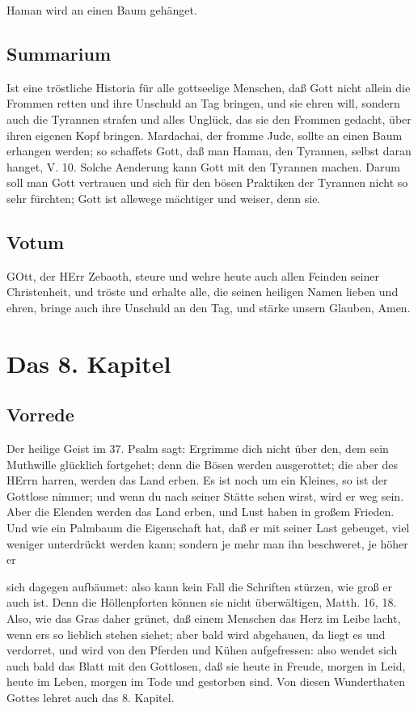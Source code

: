 Haman wird an einen Baum gehänget.

\section{Summarium}

Ist eine tröstliche Historia für alle gottseelige Menschen, daß Gott nicht allein die Frommen retten und ihre Unschuld an Tag bringen, und sie ehren will, sondern auch die Tyrannen strafen und alles Unglück, das sie den Frommen gedacht, über ihren eigenen Kopf bringen. Mardachai, der fromme Jude, sollte an einen Baum erhangen werden; so schaffets Gott, daß man Haman, den Tyrannen, selbst daran hanget, V. 10. Solche Aenderung kann Gott mit den Tyrannen machen. Darum soll man Gott vertrauen und sich für den bösen Praktiken der Tyrannen nicht so sehr fürchten; Gott ist allewege mächtiger und weiser, denn sie.

\section{Votum}

GOtt, der HErr Zebaoth, steure und wehre heute auch allen Feinden seiner Christenheit, und tröste und erhalte alle, die seinen heiligen Namen lieben und ehren, bringe auch ihre Unschuld an den Tag, und stärke unsern Glauben, Amen.

\chapter{Das 8. Kapitel}

\section{Vorrede}

Der heilige Geist im 37. Psalm sagt: Ergrimme dich nicht über den, dem sein Muthwille glücklich fortgehet; denn die Bösen werden ausgerottet; die aber des HErrn harren, werden das Land erben. Es ist noch um ein Kleines, so ist der Gottlose nimmer; und wenn du nach seiner Stätte sehen wirst, wird er weg sein. Aber die Elenden werden das Land erben, und Lust haben in großem Frieden. Und wie ein Palmbaum die Eigenschaft hat, daß er mit seiner Last gebeuget, viel weniger unterdrückt werden kann; sondern je mehr man ihn beschweret, je höher er

sich dagegen aufbäumet: also kann kein Fall die Schriften stürzen, wie groß er auch ist. Denn die Höllenpforten können sie nicht überwältigen, Matth. 16, 18. Also, wie das Gras daher grünet, daß einem Menschen das Herz im Leibe lacht, wenn ers so lieblich stehen siehet; aber bald wird abgehauen, da liegt es und verdorret, und wird von den Pferden und Kühen aufgefressen: also wendet sich auch bald das Blatt mit den Gottlosen, daß sie heute in Freude, morgen in Leid, heute im Leben, morgen im Tode und gestorben sind. Von diesen Wunderthaten Gottes lehret auch das 8. Kapitel.

